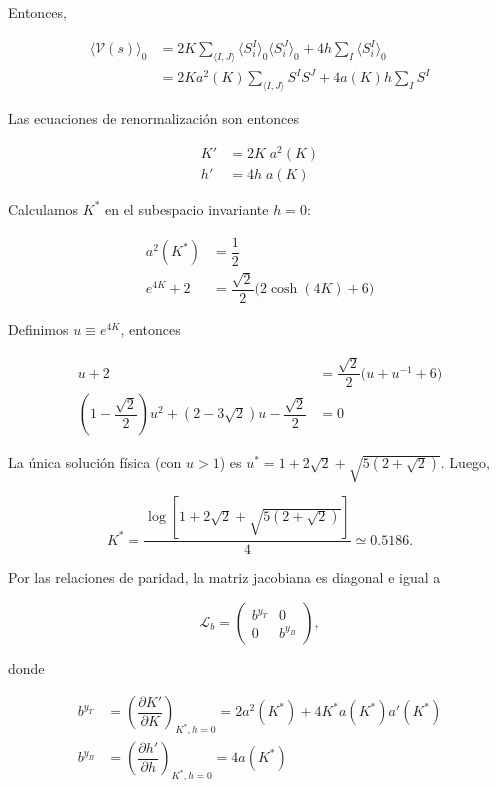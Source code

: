 \documentclass[10pt]{article}
\begin{document}
Entonces,


\begin{align}
\langle \mathcal{V}(s)\rangle_0 &= 2K\sum_{\langle I,J\rangle} \langle S_i^I \rangle_0 \langle S_i^J \rangle_0 + 4 h \sum_I  \langle S_i^I \rangle_0 \nonumber \\
&= 2K a^2(K) \sum_{\langle I,J\rangle} S^I S^J +   4 a(K) h \sum_I S^I 
\end{align}

Las ecuaciones de renormalizaci\'on son entonces

\begin{align}
K' &= 2K\;a^2(K) \\
h' &= 4h\;a(K) 
\end{align}

Calculamos $K^*$ en el subespacio invariante $h=0$:

\begin{align}
a^2(K^*) &= \dfrac{1}{2} \\
e^{4K} + 2 &= \dfrac{\sqrt{2}}{2} \bigg( 2\cosh(4K) + 6 \bigg)
\end{align}

Definimos $u \equiv e^{4K}$, entonces

\begin{align}
u + 2 &= \dfrac{\sqrt{2}}{2} \bigg( u + u^{-1} + 6 \bigg) \\
\left(1 - \dfrac{\sqrt{2}}{2}\right) u^2 + \left(2 - 3\sqrt{2}\right) u - \dfrac{\sqrt{2}}{2}&= 0
\end{align}

La \'unica soluci\'on f\'isica (con $u>1$) es $u^* = 1+2\sqrt{2}+\sqrt{5(2+\sqrt{2})}$. Luego, 

\begin{equation}
K^* = \dfrac{\log{\left[1+2\sqrt{2}+\sqrt{5(2+\sqrt{2})}\right]}}{4} \simeq 0.5186.
\end{equation}

Por las relaciones de paridad, la matriz jacobiana es diagonal e igual a 

$$
\mathcal{L}_b = 
\begin{pmatrix}
b^{y_T} & 0 \\
0 & b^{y_B}
\end{pmatrix},
$$

donde

\begin{align}
b^{y_T} &= \left( \dfrac{\partial K'}{\partial K} \right)_{K^{*},h=0} = 2a^2(K^*)+4K^*a(K^*) a'(K^*) \\
b^{y_B} &= \left( \dfrac{\partial h'}{\partial h} \right)_{K^{*},h=0} = 4a(K^*)
\end{align}
\end{document}
